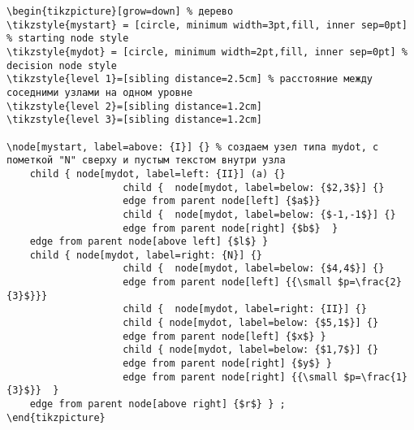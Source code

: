 \documentclass[12pt,a4paper]{article}
\begin{document}
\begin{verbatim}
\begin{tikzpicture}[grow=down] % дерево
\tikzstyle{mystart} = [circle, minimum width=3pt,fill, inner sep=0pt] % starting node style
\tikzstyle{mydot} = [circle, minimum width=2pt,fill, inner sep=0pt] % decision node style
\tikzstyle{level 1}=[sibling distance=2.5cm] % расстояние между соседними узлами на одном уровне
\tikzstyle{level 2}=[sibling distance=1.2cm]
\tikzstyle{level 3}=[sibling distance=1.2cm]

\node[mystart, label=above: {I}] {} % создаем узел типа mydot, с пометкой "N" сверху и пустым текстом внутри узла
    child { node[mydot, label=left: {II}] (a) {}
                    child {  node[mydot, label=below: {$2,3$}] {}
                    edge from parent node[left] {$a$}}
                    child {  node[mydot, label=below: {$-1,-1$}] {}
                    edge from parent node[right] {$b$}  }
    edge from parent node[above left] {$l$} }
    child { node[mydot, label=right: {N}] {}
                    child {  node[mydot, label=below: {$4,4$}] {}
                    edge from parent node[left] {{\small $p=\frac{2}{3}$}}}
                    child {  node[mydot, label=right: {II}] {}
                    child { node[mydot, label=below: {$5,1$}] {}
                    edge from parent node[left] {$x$} }
                    child { node[mydot, label=below: {$1,7$}] {}
                    edge from parent node[right] {$y$} }
                    edge from parent node[right] {{\small $p=\frac{1}{3}$}}  }
    edge from parent node[above right] {$r$} } ;
\end{tikzpicture}        
\end{verbatim}



\newpage
{}
\end{document}
